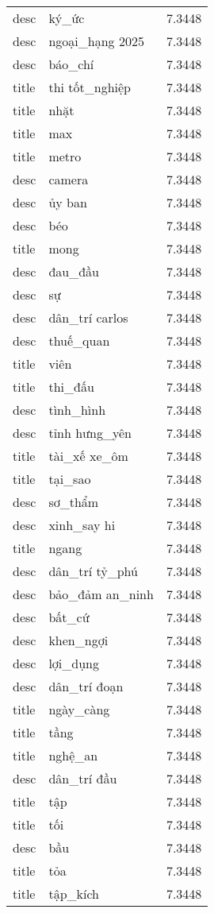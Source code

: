\documentclass{article}
\begin{document}
\begin{tabular}{lll}
desc & ký\_ức & 7.3448\\
desc & ngoại\_hạng 2025 & 7.3448\\
desc & báo\_chí & 7.3448\\
title & thi tốt\_nghiệp & 7.3448\\
title & nhặt & 7.3448\\
title & max & 7.3448\\
title & metro & 7.3448\\
desc & camera & 7.3448\\
desc & ủy ban & 7.3448\\
desc & béo & 7.3448\\
title & mong & 7.3448\\
desc & đau\_đầu & 7.3448\\
desc & sự & 7.3448\\
desc & dân\_trí carlos & 7.3448\\
desc & thuế\_quan & 7.3448\\
title & viên & 7.3448\\
title & thi\_đấu & 7.3448\\
desc & tình\_hình & 7.3448\\
desc & tỉnh hưng\_yên & 7.3448\\
title & tài\_xế xe\_ôm & 7.3448\\
title & tại\_sao & 7.3448\\
desc & sơ\_thẩm & 7.3448\\
desc & xinh\_say hi & 7.3448\\
title & ngang & 7.3448\\
desc & dân\_trí tỷ\_phú & 7.3448\\
desc & bảo\_đảm an\_ninh & 7.3448\\
desc & bất\_cứ & 7.3448\\
desc & khen\_ngợi & 7.3448\\
desc & lợi\_dụng & 7.3448\\
desc & dân\_trí đoạn & 7.3448\\
title & ngày\_càng & 7.3448\\
title & tầng & 7.3448\\
title & nghệ\_an & 7.3448\\
desc & dân\_trí đầu & 7.3448\\
title & tập & 7.3448\\
title & tối & 7.3448\\
desc & bầu & 7.3448\\
title & tỏa & 7.3448\\
title & tập\_kích & 7.3448\\

\end{tabular}
\end{document}
